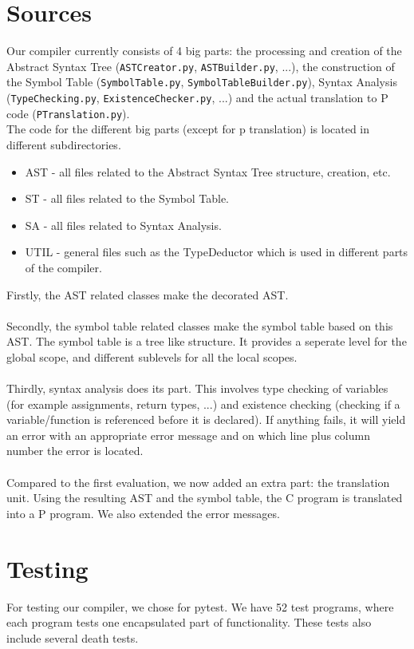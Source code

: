 \documentclass{article}
\begin{document}
\section{Sources}
Our compiler currently consists of 4 big parts: the processing and creation of the Abstract Syntax Tree (\texttt{ASTCreator.py}, \texttt{ASTBuilder.py}, ...), the construction of the Symbol Table (\texttt{SymbolTable.py}, \texttt{SymbolTableBuilder.py}), Syntax Analysis (\texttt{TypeChecking.py}, \texttt{ExistenceChecker.py}, ...) and the actual translation to P code (\texttt{PTranslation.py}).
\\
The code for the different big parts (except for p translation) is located in different subdirectories. \\
\begin{itemize}
	\item AST - all files related to the Abstract Syntax Tree structure, creation, etc.
	\item ST - all files related to the Symbol Table.
	\item SA - all files related to Syntax Analysis.
	\item UTIL - general files such as the TypeDeductor which is used in different parts of the compiler.
\end{itemize}

\newpage
\hfill \break
Firstly, the AST related classes make the decorated AST. \\ \\
Secondly, the symbol table related classes make the symbol table based on this AST. The symbol table is a tree like structure. It provides a seperate level for the global scope, and different sublevels for all the local scopes. \\ \\
Thirdly, syntax analysis does its part. This involves type checking of variables (for example assignments, return types, ...) and existence checking (checking if a variable/function is referenced before it is declared). If anything fails, it will yield an error with an appropriate error message and on which line plus column number the error is located. \\ \\
\hfill \break
Compared to the first evaluation, we now added an extra part: the translation unit. Using the resulting AST and the symbol table, the C program is translated into a P program. We also extended the error messages.

\section{Testing}
For testing our compiler, we chose for pytest. We have 52 test programs, where each program tests one encapsulated part of functionality. These tests also include several death tests.
\end{document}
